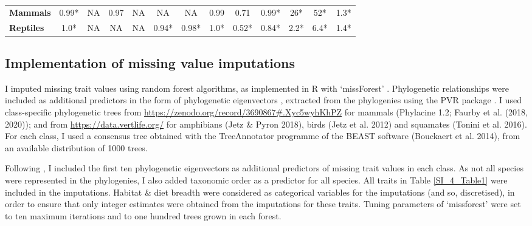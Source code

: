 \begin{table}[h!]
\begin{center}
\begin{tabular}{l|c|c|c|c|c|c|c|c|c|c|c|c|}
\multicolumn{1}{|l|}{\textbf{Mammals}}    & 0.99*       & NA          & 0.97        & NA          & NA          & NA         & 0.99         & 0.71    &  0.99*  & 26*         & 52*      & 1.3*        \\ %
\multicolumn{1}{|l|}{\textbf{Reptiles}}   & 1.0*        & NA          & NA          & NA          & 0.94*       & 0.98*      & 1.0*         & 0.52*    & 0.84*  & 2.2*        & 6.4*     & 1.4*        \\ \hline
\end{tabular}
\end{center}
\end{table}

\subsection{Implementation of missing value imputations}
I imputed missing trait values using random forest algorithms, as implemented in R with `missForest' \citep{Stekhoven2012, Stekhoven2016}. Phylogenetic relationships were included as additional predictors in the form of phylogenetic eigenvectors \citep{DinizFilho2012}, extracted from the phylogenies using the PVR package \citep{Santos2018}. I used class-specific phylogenetic trees from \url{https://zenodo.org/record/3690867#.Xyc5wyhKhPZ} for mammals (Phylacine 1.2; Faurby et al. (2018, 2020)); and from \url{https://data.vertlife.org/} for amphibians (Jetz \& Pyron 2018), birds (Jetz et al. 2012) and squamates (Tonini et al. 2016). For each class, I used a consensus tree obtained with the TreeAnnotator programme of the BEAST software (Bouckaert et al. 2014), from an available distribution of 1000 trees. 

Following \citet{Penone2014}, I included the first ten phylogenetic eigenvectors as additional predictors of missing trait values in each class. As not all species were represented in the phylogenies, I also added taxonomic order as a predictor for all species. All traits in Table \ref{SI_4_Table1} were included in the imputations. Habitat \& diet breadth were considered as categorical variables for the imputations (and so, discretised), in order to ensure that only integer estimates were obtained from the imputations for these traits. Tuning parameters of `missforest' were set to ten maximum iterations and to one hundred trees grown in each forest.

